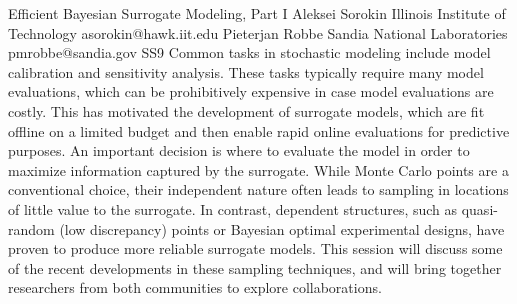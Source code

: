 \documentclass[12pt,a4paper,figuresright]{book}
\begin{document}
\begin{session}
 {Efficient Bayesian Surrogate Modeling, Part I}%
 {Aleksei Sorokin}%
 {Illinois Institute of Technology}%
 {asorokin@hawk.iit.edu}%
 {Pieterjan Robbe}%
 {Sandia National Laboratories}%
 {pmrobbe@sandia.gov}%
 {SS9}%
 {}%
 Common tasks in stochastic modeling include model calibration and sensitivity analysis. These tasks typically require many model evaluations, which can be prohibitively expensive in case model evaluations are costly. This has motivated the development of surrogate models, which are fit offline on a limited budget and then enable rapid online evaluations for predictive purposes. An important decision is where to evaluate the model in order to maximize information captured by the surrogate. While Monte Carlo points are a conventional choice, their independent nature often leads to sampling in locations of little value to the surrogate. In contrast, dependent structures, such as quasi-random (low discrepancy) points or Bayesian optimal experimental designs, have proven to produce more reliable surrogate models. This session will discuss some of the recent developments in these sampling techniques, and will bring together researchers from both communities to explore collaborations.
\end{session}



%


\clearpage
\end{document}
